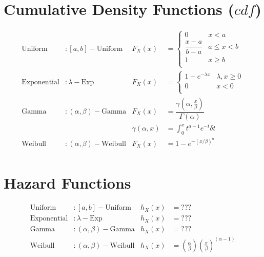 \documentclass[10pt]{report}
\begin{document}
\section*{Cumulative Density Functions ($cdf$)}
\begin{align*}
\text{Uniform}& : [a,b]-\text{Uniform}& F_{X}(x) & = 
	\begin{cases}
	0& x < a\\
	\dfrac{x-a}{b-a}& a \leq x < b\\
	1& x \geq b\\
	\end{cases}\\
\text{Exponential}& : \lambda-\text{Exp}& F_{X}(x) & = 
	\begin{cases}
	1 - e^{-\lambda x}& \lambda, x \geq 0\\
	0& x < 0\\
	\end{cases}\\
\text{Gamma}& : (\alpha, \beta)-\text{Gamma}& F_{X}(x) & = \dfrac{\gamma\left(\alpha,\frac{x}{\beta}\right)}{\Gamma(\alpha)}\\
 & & \gamma\left(\alpha, x\right)& = \int_{0}^{x}t^{a-1}e^{-t}\delta t\\
\text{Weibull}& : (\alpha, \beta)-\text{Weibull}& F_{X}(x) & = 1 - e^{-\left(x/\beta\right)^{\alpha}}\\
\end{align*}

\pagebreak

\section*{Hazard Functions}
\begin{align*}
\text{Uniform}& : [a,b]-\text{Uniform}& h_{X}(x) & = ???\\
\text{Exponential}& : \lambda-\text{Exp}& h_{X}(x) & = ???\\
\text{Gamma}& : (\alpha, \beta)-\text{Gamma}& h_{X}(x) & = ???\\ 
\text{Weibull}& : (\alpha, \beta)-\text{Weibull}& h_{X}(x) & = \left(\frac{\alpha}{\beta}\right)\left(\frac{x}{\beta}\right)^{\left(\alpha - 1\right)}\\
\end{align*}

\pagebreak
\end{document}
